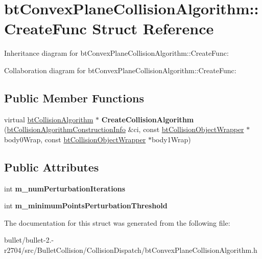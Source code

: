 \hypertarget{structbt_convex_plane_collision_algorithm_1_1_create_func}{\section{bt\+Convex\+Plane\+Collision\+Algorithm\+:\+:Create\+Func Struct Reference}
\label{structbt_convex_plane_collision_algorithm_1_1_create_func}
}


Inheritance diagram for bt\+Convex\+Plane\+Collision\+Algorithm\+:\+:Create\+Func\+:


Collaboration diagram for bt\+Convex\+Plane\+Collision\+Algorithm\+:\+:Create\+Func\+:
\subsection*{Public Member Functions}
\begin{DoxyCompactItemize}
\item 
\hypertarget{structbt_convex_plane_collision_algorithm_1_1_create_func_a2a10ae82cca2eec896084e5d8d13254f}{virtual \hyperlink{classbt_collision_algorithm}{bt\+Collision\+Algorithm} $\ast$ {\bfseries Create\+Collision\+Algorithm} (\hyperlink{structbt_collision_algorithm_construction_info}{bt\+Collision\+Algorithm\+Construction\+Info} \&ci, const \hyperlink{structbt_collision_object_wrapper}{bt\+Collision\+Object\+Wrapper} $\ast$body0\+Wrap, const \hyperlink{structbt_collision_object_wrapper}{bt\+Collision\+Object\+Wrapper} $\ast$body1\+Wrap)}\label{structbt_convex_plane_collision_algorithm_1_1_create_func_a2a10ae82cca2eec896084e5d8d13254f}

\end{DoxyCompactItemize}
\subsection*{Public Attributes}
\begin{DoxyCompactItemize}
\item 
\hypertarget{structbt_convex_plane_collision_algorithm_1_1_create_func_acc1dd2f69290d4e232ae9320dc2baed2}{int {\bfseries m\+\_\+num\+Perturbation\+Iterations}}\label{structbt_convex_plane_collision_algorithm_1_1_create_func_acc1dd2f69290d4e232ae9320dc2baed2}

\item 
\hypertarget{structbt_convex_plane_collision_algorithm_1_1_create_func_a3122e0acf9e61affe926ef5ea019fb10}{int {\bfseries m\+\_\+minimum\+Points\+Perturbation\+Threshold}}\label{structbt_convex_plane_collision_algorithm_1_1_create_func_a3122e0acf9e61affe926ef5ea019fb10}

\end{DoxyCompactItemize}


The documentation for this struct was generated from the following file\+:\begin{DoxyCompactItemize}
\item 
bullet/bullet-\/2.-\/r2704/src/\+Bullet\+Collision/\+Collision\+Dispatch/bt\+Convex\+Plane\+Collision\+Algorithm.\+h\end{DoxyCompactItemize}
